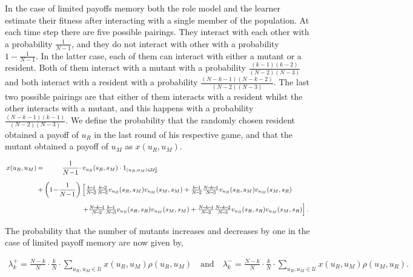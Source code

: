 \documentclass[11pt]{article}
\theoremstyle{plainCl1}
\theoremstyle{plainCl2}
\begin{document}
In the case of limited payoffs memory both the role model and the learner
estimate their fitness after interacting with a single member of the population.
At each time step there are five possible pairings. They interact with each
other with a probability \(\frac{1}{N - 1}\), and they do not interact with
other with a probability \(1 - \frac{1}{N - 1}\). In the latter case, each of
them can interact with either a mutant or a resident. Both of them interact with
a mutant with a probability $\frac{(k-1)(k-2)}{(N-2)(N-3)}$ and both interact
with a resident with a probability $\frac{(N-k-1)(N-k-2)}{(N-2)(N-3)}$. The last
two possible pairings are that either of them interacts with a resident whilst
the other interacts with a mutant, and this happens with a probability
$\frac{(N-k-1)(k-1)}{(N-2)(N-3)}$. We define the probability that the randomly
chosen resident obtained a payoff of $u_R$ in the last round of his respective
game, and that the mutant obtained a payoff of $u_M$ as $x(u_R,u_M)$.

\begin{equation}\label{eq:Chi}
\setlength{\arraycolsep}{1pt}
\begin{array}{llrl}
x(u_R,u_M)	 &=&\displaystyle \frac{1}{N\!-\!1}\cdot  &v_{u_R}(s_R,s_M)\cdot 1_{(u_R,u_M)\in \mathcal{U}^2_F}\\[0.5cm]
&+	
&\displaystyle \left(1\!-\!\frac{1}{N\!-\!1}\right)  
&\left[ \frac{k\!-\!1}{N\!-\!2}\frac{k\!-\!2}{N\!-\!3} v_{u_R}(s_R,s_M) v_{u_M}(s_M,s_M) + 
 \frac{k\!-\!1}{N\!-\!2}\frac{N\!-\!k\!-\!1}{N\!-\!3} v_{u_R}(s_R,s_M) v_{u_M}(s_M,s_R)\right.\\[0.5cm]
&&&\left. +\frac{N\!-\!k\!-\!1}{N\!-\!2}\frac{k\!-\!1}{N\!-\!3} v_{u_R}(s_R,s_R) v_{u_M}(s_M,s_M) + 
 \frac{N\!-\!k\!-\!1}{N\!-\!2}\frac{N\!-\!k\!-\!2}{N\!-\!3} v_{u_R}(s_R,s_R) v_{u_M}(s_M,s_R)\right].
\end{array}
\end{equation}

The probability that the number of mutants increases and decreases by one in the
case of limited payoff memory are now given by,

\begin{align}\label{eq:limited_memory_lambdas}
\lambda^+_k=\frac{N\!-\!k}{N} \cdot \frac{k}{N} \cdot \sum_{u_{R},u_{M}\in\mathcal{U}} x(u_{R},u_{M}) \rho(u_{R},u_{M}) \quad \text{and} \quad
\lambda^-_k=\frac{N\!-\!k}{N} \cdot \frac{k}{N} \cdot \sum_{u_{R},u_{M}\in\mathcal{U}} x(u_{R},u_{M}) \rho(u_{M},u_{R}).
\end{align}
\end{document}
